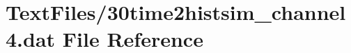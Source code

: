 \hypertarget{30time2histsim__channel4_8dat}{}\section{Text\+Files/30time2histsim\+\_\+channel4.dat File Reference}
\label{30time2histsim__channel4_8dat}
